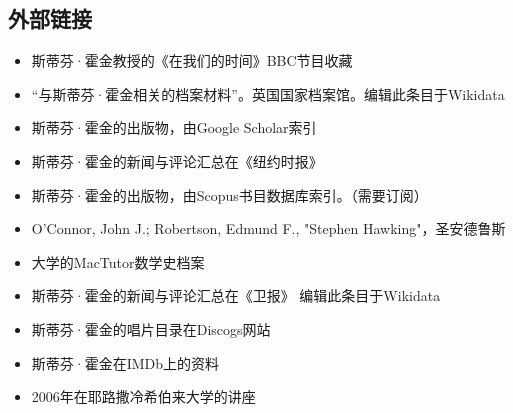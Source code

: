 \subsection{外部链接} 
\begin{itemize}
\item 斯蒂芬·霍金教授的《在我们的时间》BBC节目收藏  
\item “与斯蒂芬·霍金相关的档案材料”。英国国家档案馆。编辑此条目于Wikidata  
\item 斯蒂芬·霍金的出版物，由Google Scholar索引  
\item 斯蒂芬·霍金的新闻与评论汇总在《纽约时报》  
\item 斯蒂芬·霍金的出版物，由Scopus书目数据库索引。（需要订阅）  
\item O'Connor, John J.; Robertson, Edmund F., "Stephen Hawking"，圣安德鲁斯\item 大学的MacTutor数学史档案  
\item 斯蒂芬·霍金的新闻与评论汇总在《卫报》 编辑此条目于Wikidata  
\item 斯蒂芬·霍金的唱片目录在Discogs网站  
\item 斯蒂芬·霍金在IMDb上的资料  
\item 2006年在耶路撒冷希伯来大学的讲座
\end{itemize}